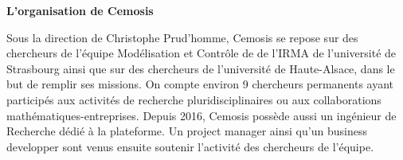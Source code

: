 \documentclass[10pt,a4paper]{article}
\newcommand{\NewsItem}[1]{%
			
		\large \bfseries #1 \vspace{4pt}
		\par \normalsize \normalfont}
\begin{document}
\vspace{1cm}

\NewsItem{L'organisation de Cemosis}
Sous la direction de Christophe Prud'homme, Cemosis se repose sur des chercheurs de l'équipe Modélisation et Contrôle de de l'IRMA de l'université de Strasbourg ainsi que sur des chercheurs de l'université de Haute-Alsace, dans le but de remplir ses missions. On compte environ 9 chercheurs permanents ayant participés aux activités de recherche pluridisciplinaires ou aux collaborations mathématiques-entreprises.
Depuis 2016, Cemosis possède aussi un ingénieur de Recherche dédié à la plateforme. Un project manager ainsi qu'un business developper sont venus ensuite	 soutenir l'activité des chercheurs de l'équipe.

\end{document}
